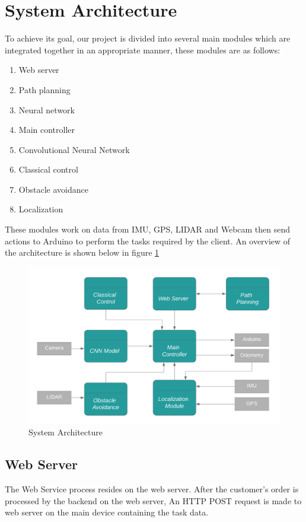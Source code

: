 \section{System Architecture}
\hspace{2cm}To achieve its goal, our project is divided into several main modules which are integrated together in an appropriate manner, these modules are as follows:\\
\begin{enumerate}
    \item Web server
    \item Path planning
    \item Neural network 
    \item Main controller
    \item Convolutional Neural Network
    \item Classical control
    \item Obstacle avoidance
    \item Localization 
\end{enumerate}
These modules work on data from IMU, GPS, LIDAR and Webcam then send actions to Arduino to perform the tasks required by the client. An overview of the architecture is shown below in figure \ref{fig:system_arch}

  \begin{figure}[H]%
    \center%
    \includegraphics[width=\textwidth]
    {images/Alzahraa/system_arch.png}%
    \caption[System Architecture]{System Architecture}\label{fig:system_arch}%
  \end{figure}
  
\subsection{Web Server}
\hspace{2cm}The Web Service process resides on the web server. After the customer’s order is processed by the backend on the web server, An HTTP POST request is made to web server on the main device containing the task data.

